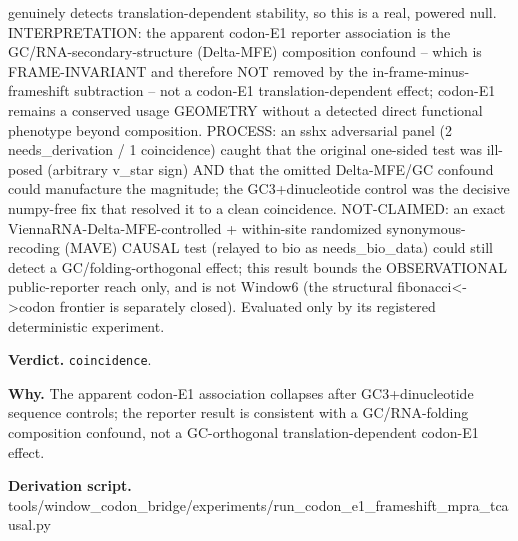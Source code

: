 genuinely detects translation-dependent stability, so this is a real, powered null. INTERPRETATION:
the apparent codon-E1 reporter association is the GC/RNA-secondary-structure (Delta-MFE) composition
confound -- which is FRAME-INVARIANT and therefore NOT removed by the in-frame-minus-frameshift
subtraction -- not a codon-E1 translation-dependent effect; codon-E1 remains a conserved usage
GEOMETRY without a detected direct functional phenotype beyond composition. PROCESS: an sshx
adversarial panel (2 needs\_derivation / 1 coincidence) caught that the original one-sided test was
ill-posed (arbitrary v\_star sign) AND that the omitted Delta-MFE/GC confound could manufacture the
magnitude; the GC3+dinucleotide control was the decisive numpy-free fix that resolved it to a clean
coincidence. NOT-CLAIMED: an exact ViennaRNA-Delta-MFE-controlled + within-site randomized
synonymous-recoding (MAVE) CAUSAL test (relayed to bio as needs\_bio\_data) could still detect a
GC/folding-orthogonal effect; this result bounds the OBSERVATIONAL public-reporter reach only, and
is not Window6 (the structural fibonacci<->codon frontier is separately closed). Evaluated only by
its registered deterministic experiment.

\textbf{Verdict.} \texttt{coincidence}.

\textbf{Why.} The apparent codon-E1 association collapses after GC3+dinucleotide sequence controls; the reporter
result is consistent with a GC/RNA-folding composition confound, not a GC-orthogonal
translation-dependent codon-E1 effect.

\textbf{Derivation script.} tools/window\_codon\_bridge/experiments/run\_codon\_e1\_frameshift\_mpra\_tcausal.py


